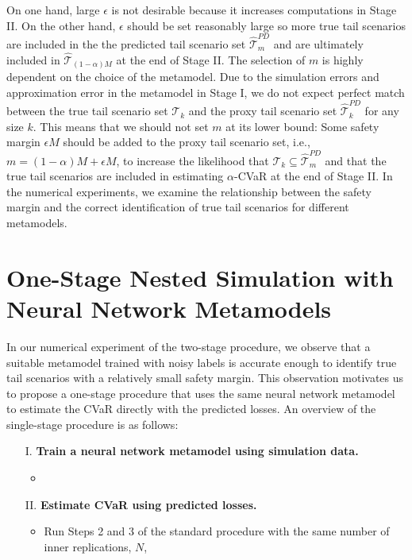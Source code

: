 \documentclass[]{article}
\newcommand{\tail}{\mathcal{T}}
\begin{document}
On one hand, large $\epsilon$ is not desirable because it increases computations in Stage II.
On the other hand, $\epsilon$ should be set reasonably large so more true tail scenarios are included in the the predicted tail scenario set $\widehat{\tail}_{m}^{PD}$ and are ultimately included in $\widehat{\tail}_{(1-\alpha )M}$ at the end of Stage II.
The selection of $m$ is highly dependent on the choice of the metamodel.
Due to the simulation errors and approximation error in the metamodel in Stage I, we do not expect perfect match between the true tail scenario set $\tail_{k}$ and the proxy tail scenario set $\widehat{\tail}_{k}^{PD}$ for any size $k$.
This means that we should not set $m$ at its lower bound: Some safety margin $\epsilon M$ should be added to the proxy tail scenario set, i.e., $m = (1-\alpha )M + \epsilon M$, to increase the likelihood that $\tail_{k} \subseteq \widehat{\tail}_{m}^{PD}$ and that the true tail scenarios are included in estimating $\alpha$-CVaR at the end of Stage II.
In the numerical experiments, we examine the relationship between the safety margin and the correct identification of true tail scenarios for different metamodels.

\section{One-Stage Nested Simulation with Neural Network Metamodels} \label{sec:metamodel1Stage}

In our numerical experiment of the two-stage procedure, we observe that a suitable metamodel trained with noisy labels is accurate enough to identify true tail scenarios with a relatively small safety margin.
This observation motivates us to propose a one-stage procedure that uses the same neural network metamodel to estimate the CVaR directly with the predicted losses. 
An overview of the single-stage procedure is as follows:

\begin{itemize}
    \item[I.] \textbf{Train a neural network metamodel using simulation data.}
    \begin{itemize}[leftmargin=0pt]
        \item 
    \end{itemize}
    \item[II.] \textbf{Estimate CVaR using predicted losses.}
    \begin{itemize}[leftmargin=0pt]
        
        \item Run Steps 2 and 3 of the standard procedure with the same number of inner replications, $N$,
    \end{itemize}
        
\end{itemize}
\end{document}
